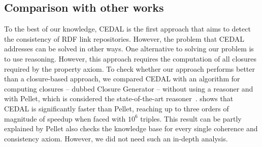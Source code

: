 \subsection{Comparison with other works}
To the best of our knowledge, CEDAL is the first approach that aims to detect the consistency of RDF link repositories. However, the problem that CEDAL addresses can be solved in other ways.
One alternative to solving our problem is to use reasoning. However, this approach requires the computation of all closures required by the property axiom.
To check whether our approach performs better than a closure-based approach, we compared CEDAL with an algorithm for computing closures -- dubbed Closure Generator -- without using a reasoner and with Pellet, which is considered the state-of-the-art reasoner~\cite{bockbenchmarking}. 
 shows that CEDAL is significantly faster than Pellet, reaching up to three orders of magnitude of speedup when faced with $10^6$ triples.
This result can be partly explained by Pellet also checks the knowledge base for every single coherence and consistency axiom. However, we did not need such an in-depth analysis.


